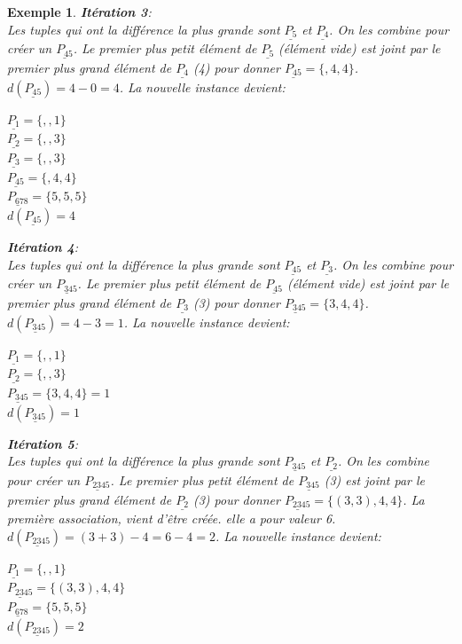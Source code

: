 \documentclass[a4paper,12pt]{report}
\theoremstyle{plain}				%
\newtheorem{example}{Exemple}
\theoremstyle{definition}				%
\begin{document}
\begin{itemize}
\begin{example}
\textbf{Itération 3}:\\
Les tuples qui ont la différence la plus grande sont
$\underline{P_{5}}$  et $\underline{P_{4}}$.
On les combine pour créer un $\underline{P_{45}}$. Le premier plus
petit élément de $\underline{P_{5}}$ (élément vide) est joint par le
premier plus grand élément de $\underline{P_{4}}$ (4) pour donner
$\underline{P_{45}} = \{,4,4\}$. $d(\underline{P_{45}}) = 4-0 = 4$.
La nouvelle instance devient:
\begin{multicols}{3}
$\underline{P_{1}} = \{,,1\}$\\
$\underline{P_{2}} = \{,,3\}$\\
$\underline{P_{3}} = \{,,3\}$\\
$\underline{P_{45}} = \{,4,4\}$\\
$\underline{P_{678}} = \{5,5,5\}$\\
$d(\underline{P_{45}}) = 4$
\end{multicols}

\textbf{Itération 4}:\\
Les tuples qui ont la différence la plus grande sont
$\underline{P_{45}}$  et $\underline{P_{3}}$.
On les combine pour créer un $\underline{P_{345}}$. Le premier plus
petit élément de $\underline{P_{45}}$ (élément vide) est joint par le
premier plus grand élément de $\underline{P_{3}}$ (3) pour donner
$\underline{P_{345}} = \{3,4,4\}$. $d(\underline{P_{345}}) = 4-3 =
1$.
La nouvelle instance devient:
\begin{multicols}{3}
$\underline{P_{1}} = \{,,1\}$\\
$\underline{P_{2}} = \{,,3\}$\\
$\underline{P_{345}} = \{3,4,4\}=1$\\
$d(\underline{P_{345}}) = 1$
\end{multicols}

\textbf{Itération 5}:\\
Les tuples qui ont la différence la plus grande sont
$\underline{P_{345}}$  et $\underline{P_{2}}$.
On les combine pour créer un $\underline{P_{2345}}$. Le premier plus
petit élément de $\underline{P_{345}}$ (3) est joint par le premier
plus grand élément de $\underline{P_{2}}$ (3) pour donner
$\underline{P_{2345}} = \{(3,3),4,4\}$. La première association, vient
d'être créée. elle a pour valeur 6.
$d(\underline{P_{2345}}) = (3+3)-4 = 6-4=2$. La nouvelle instance devient:
\begin{multicols}{2}
$\underline{P_{1}} = \{,,1\}$\\
$\underline{P_{2345}} = \{(3,3),4,4\}$\\
$\underline{P_{678}} = \{5,5,5\}$\\
$d(\underline{P_{2345}}) = 2$
\end{multicols}


\end{example}
\end{itemize}
\end{document}
